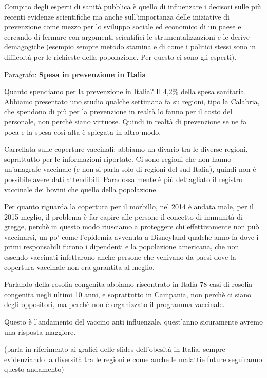 \documentclass[]{article}
\begin{document}
Compito degli esperti di sanità pubblica è quello di influenzare i
decisori sulle più recenti evidenze scientifiche ma anche
sull'importanza delle iniziative di prevenzione come mezzo per lo
sviluppo sociale ed economico di un paese e cercando di fermare con
argomenti scientifici le strumentalizzazioni e le derive demagogiche
(esempio sempre metodo stamina e di come i politici stessi sono in
difficoltà per le richieste della popolazione. Per questo ci sono gli
esperti).

Paragrafo: \textbf{Spesa in prevenzione in Italia}

Quanto spendiamo per la prevenzione in Italia? Il 4,2\% della spesa
sanitaria. Abbiamo presentato uno studio qualche settimana fa su
regioni, tipo la Calabria, che spendono di più per la prevenzione in
realtà lo fanno per il costo del personale, non perchè siano virtuose.
Quindi in realtà di prevenzione se ne fa poca e la spesa così alta è
spiegata in altro modo.

Carrellata sulle coperture vaccinali: abbiamo un divario tra le diverse
regioni, soprattutto per le informazioni riportate. Ci sono regioni che
non hanno un'anagrafe vaccinale (e non si parla solo di regioni del sud
Italia), quindi non è possibile avere dati attendibili. Paradossalmente
è più dettagliato il registro vaccinale dei bovini che quello della
popolazione.

Per quanto riguarda la copertura per il morbillo, nel 2014 è andata
male, per il 2015 meglio, il problema è far capire alle persone il
concetto di immunità di gregge, perchè in questo modo riusciamo a
proteggere chi effettivamente non può vaccinarsi, un po' come l'epidemia
avvenuta a Disneyland qualche anno fa dove i primi responsabili furono i
dipendenti e la popolazione americana, che non essendo vaccinati
infettarono anche persone che venivano da paesi dove la copertura
vaccinale non era garantita al meglio.

Parlando della rosolia congenita abbiamo riscontrato in Italia 78 casi
di rosolia congenita negli ultimi 10 anni, e soprattutto in Campania,
non perchè ci siano degli oppositori, ma perchè non è organizzato il
programma vaccinale.

Questo è l'andamento del vaccino anti influenzale, quest'anno
sicuramente avremo una risposta maggiore.

(parla in riferimento ai grafici delle slides dell'obesità in Italia,
sempre evidenziando la diversità tra le regioni e come anche le malattie
future seguiranno questo andamento)
\end{document}
